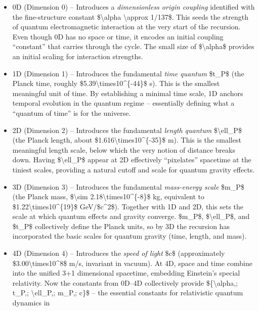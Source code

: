 \documentclass[]{article}
\begin{document}
\begin{itemize}
\item
  0D (Dimension 0) -- Introduces a \emph{dimensionless origin coupling}
  identified with the fine-structure constant \$\textbackslash{}alpha
  \textbackslash{}approx 1/137\$. This seeds the strength of quantum
  electromagnetic interaction at the very start of the recursion. Even
  though 0D has no space or time, it encodes an initial coupling
  ``constant'' that carries through the cycle. The small size of
  \$\textbackslash{}alpha\$ provides an initial scaling for interaction
  strengths.
\item
  1D (Dimension 1) -- Introduces the fundamental \emph{time quantum}
  \$t\_P\$ (the Planck time, roughly
  \$5.39\textbackslash{}times10\^{}\{-44\}\$ s). This is the smallest
  meaningful unit of time. By establishing a minimal time scale, 1D
  anchors temporal evolution in the quantum regime -- essentially
  defining what a ``quantum of time'' is for the universe.
\item
  2D (Dimension 2) -- Introduces the fundamental \emph{length quantum}
  \$\textbackslash{}ell\_P\$ (the Planck length, about
  \$1.616\textbackslash{}times10\^{}\{-35\}\$ m). This is the smallest
  meaningful length scale, below which the very notion of distance
  breaks down. Having \$\textbackslash{}ell\_P\$ appear at 2D
  effectively ``pixelates'' spacetime at the tiniest scales, providing a
  natural cutoff and scale for quantum gravity effects.
\item
  3D (Dimension 3) -- Introduces the fundamental \emph{mass-energy
  scale} \$m\_P\$ (the Planck mass, \$\textbackslash{}sim
  2.18\textbackslash{}times10\^{}\{-8\}\$ kg, equivalent to
  \$1.22\textbackslash{}times10\^{}\{19\}\$ GeV/\$c\^{}2\$). Together
  with 1D and 2D, this sets the scale at which quantum effects and
  gravity converge. \$m\_P\$, \$\textbackslash{}ell\_P\$, and \$t\_P\$
  collectively define the Planck units, so by 3D the recursion has
  incorporated the basic scales for quantum gravity (time, length, and
  mass).
\item
  4D (Dimension 4) -- Introduces the \emph{speed of light} \$c\$
  (approximately \$3.00\textbackslash{}times10\^{}8\$ m/s, invariant in
  vacuum). At 4D, space and time combine into the unified 3+1
  dimensional spacetime, embedding Einstein's special relativity. Now
  the constants from 0D--4D collectively provide
  \$\{\textbackslash{}alpha,; t\_P,; \textbackslash{}ell\_P,; m\_P,;
  c\}\$ -- the essential constants for relativistic quantum dynamics in

\end{itemize}
\end{document}
